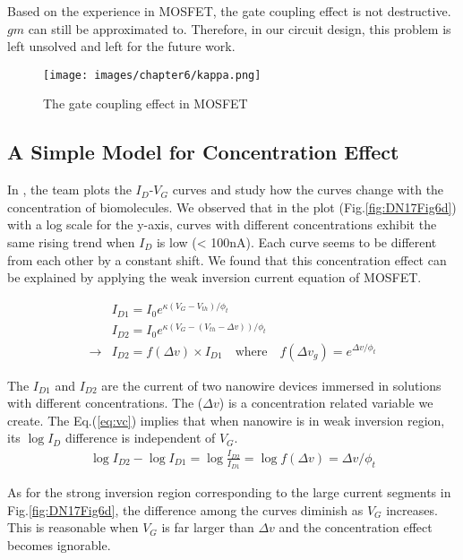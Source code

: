 Based on the experience in MOSFET, the gate coupling effect is not destructive.
$gm$ can still be approximated to.
Therefore, in our circuit design, this problem is left unsolved and left for the future work.

\begin{figure}[bt!h]
    \centering
    \texttt{[image: images/chapter6/kappa.png]}
    \caption{The gate coupling effect in MOSFET \cite{bookOfUltra}}
    \label{fig:gateCouple}
\end{figure}




\subsection{A Simple Model for Concentration Effect}
In \cite{DN17}, the team plots the $I_D$-$V_G$ curves and study how the curves change with the concentration of biomolecules.
We observed that in the plot (Fig.\ref{fig:DN17Fig6d}) with a log scale for the y-axis, curves with different concentrations exhibit the same rising trend when $I_D$ is low (< 100nA).
Each curve seems to be different from each other by a constant shift.
We found that this concentration effect can be explained by applying the weak inversion current equation of MOSFET.

\begin{align}
    & I_{D1} = I_{0} e^{\kappa(V_{G} - V_{th}) / \phi_t} \\
    & I_{D2} = I_{0} e^{\kappa(V_{G} - (V_{th} - \Delta v)) / \phi_t} \\
    \rightarrow & I_{D2} = f(\Delta v) \times I_{D1} \quad \text{where} \quad f(\Delta v_g) = e^{\Delta v / \phi_t} \label{eq:vc}
\end{align}

The $I_{D1}$ and $I_{D2}$ are the current of two nanowire devices immersed in solutions with different concentrations.
The ($\Delta v$) is a concentration related variable we create.
The Eq.(\ref{eq:vc}) implies that when nanowire is in weak inversion region, its $\log I_D$ difference is independent of $V_G$.
\begin{align}
    \log I_{D2} - \log I_{D1} = \log \frac{I_{D2}}{I_{D1}} = \log f(\Delta v) = \Delta v / \phi_t
\end{align}

As for the strong inversion region corresponding to the large current segments in Fig.\ref{fig:DN17Fig6d}, the difference among the curves diminish as $V_G$ increases.
This is reasonable when $V_{G}$ is far larger than $\Delta v$ and the concentration effect becomes ignorable.


